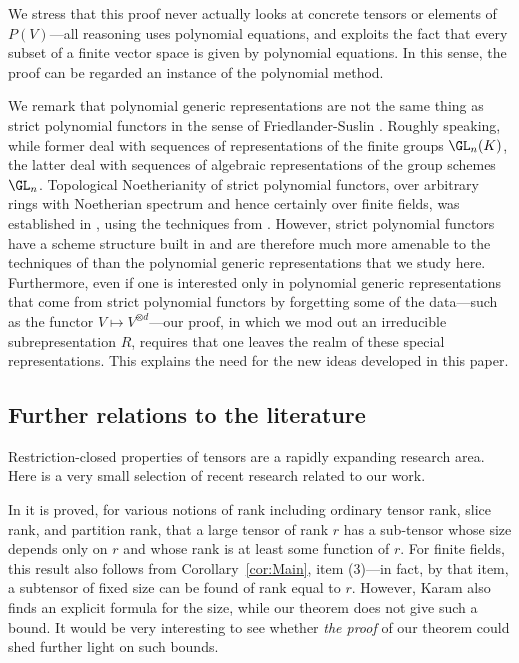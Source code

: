 \documentclass{amsart}
\begin{document}
We stress that this proof never actually looks at concrete tensors
or elements of $P(V)$---all reasoning uses polynomial
equations, and exploits the fact that every subset of a finite vector space is given
by polynomial equations. In this sense, the proof can be regarded an
instance of the polynomial method.

We remark that polynomial generic representations are not the same
thing as strict polynomial functors in the sense of Friedlander-Suslin
\cite{Friedlander97}. Roughly speaking, while former deal with sequences of
representations of the finite groups $\GL_n(K)$, the latter deal
with sequences of algebraic representations of the group schemes
$\GL_n$. Topological Noetherianity of strict polynomial functors,
over arbitrary rings with Noetherian spectrum and hence certainly over
finite fields, was established in \cite{Draisma20b}, using the techniques from
\cite{Draisma17}. However, strict polynomial functors have a
scheme structure built in and are therefore much more amenable to the techniques of
\cite{Draisma17} than
the polynomial generic representations that we study here. Furthermore,
even if one is interested only in polynomial generic representations
that come from strict polynomial functors by forgetting some of the
data---such as the functor $V \mapsto V^{\otimes d}$---our proof, in
which we mod out an irreducible subrepresentation $R$, requires that
one leaves the realm of these special representations.  This explains
the need for the new ideas developed in this paper.

\subsection{Further relations to the literature}

Restriction-closed properties of tensors are a rapidly expanding research
area. Here is a very small selection of recent research related to
our work.

In \cite{Karam22} it is proved, for various notions of rank including
ordinary tensor rank, slice rank, and partition rank, that a large tensor
of rank $r$ has a sub-tensor whose size depends only on $r$ and whose
rank is at least some function of $r$. For finite fields, this result also
follows from Corollary~\ref{cor:Main}, item (3)---in fact, by that item,
a subtensor of fixed size can be found of rank equal to $r$.  However,
Karam also finds an explicit formula for the size, while our theorem
does not give such a bound. It would be very interesting to see whether
{\em the proof} of our theorem could shed further light on such bounds.
\end{document}
